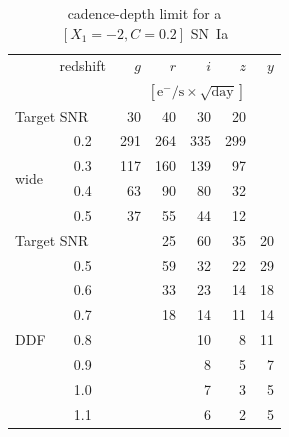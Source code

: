 \documentclass[\docopts]{\docclass}
\begin{document}
\begin{table}[t]
\begin{center}
\caption{cadence-depth limit for a $[X_1=-2, C=0.2]$ SN~Ia}
\label{tab:cadence_depth_limit}
\begin{tabular}{l|c|rrrrr}
\hline
\hline
 &   redshift   &      $g$         &       $r$         &     $i$           &      $z$        &      $y$           \\
 &              &      \multicolumn{5}{c}{$[\mathrm{e^-/s \times \sqrt{day}}]$} \\
\hline
  \multicolumn{2}{l}{Target SNR}  &     30  &      40 &      30 &      20 & \\
\hline
 \multirow{4}{*}{wide}  &     0.2  &     291 &     264 &     335 &     299 & \\
                        &     0.3  &     117 &     160 &     139 &      97 & \\
                        &     0.4  &      63 &      90 &      80 &      32 & \\
                        &     0.5  &      37 &      55 &      44 &      12 & \\
\hline
  \multicolumn{2}{l}{Target SNR} &  & 25 &     60  &  35     &      20   \\
\hline
  \multirow{7}{*}{DDF}                       &     0.5  &    & 59 &      32 &      22 &      29   \\
                       &     0.6  &    & 33 &      23 &      14 &      18   \\
                       &     0.7  &    & 18 &      14 &      11 &      14   \\
                       &     0.8  &    &    &      10 &       8 &      11   \\
                       &     0.9  &    &    &       8 &       5 &       7   \\
                       &     1.0  &    &    &       7 &       3 &       5   \\
                       &     1.1  &    &    &       6 &       2 &       5   \\


 

\end{tabular}
\end{center}
\end{table}
\end{document}
